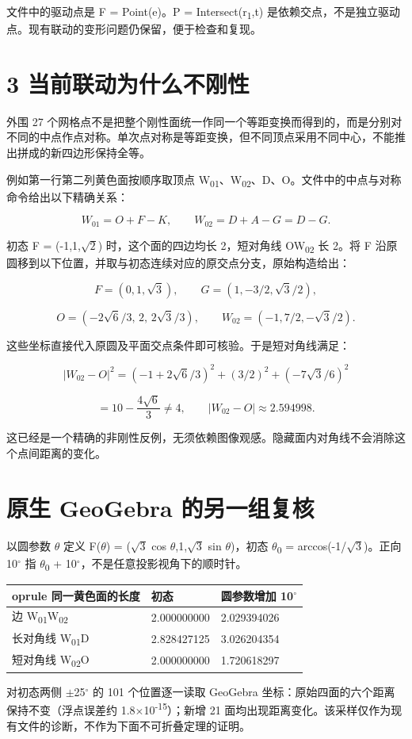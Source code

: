 \documentclass[UTF8,a4paper,11pt]{ctexart}
\begin{document}
文件中的驱动点是 F = Point(e)。P = Intersect(r\textsubscript{1},t) 是依赖交点，不是独立驱动点。现有联动的变形问题仍保留，便于检查和复现。

\newpage
\section*{3  当前联动为什么不刚性}
外围 27 个网格点不是把整个刚性面统一作同一个等距变换而得到的，而是分别对不同的中点作点对称。单次点对称是等距变换，但不同顶点采用不同中心，不能推出拼成的新四边形保持全等。

例如第一行第二列黄色面按顺序取顶点 W\textsubscript{01}、W\textsubscript{02}、D、O。文件中的中点与对称命令给出以下精确关系：


\[
W_{01}=O+F-K,\qquad W_{02}=D+A-G=D-G.
\]

初态 F = (-1,1,\(\sqrt{2}\)) 时，这个面的四边均长 2，短对角线 OW\textsubscript{02} 长 2。将 F 沿原圆移到以下位置，并取与初态连续对应的原交点分支，原始构造给出：


\[
F=(0,1,\sqrt{3}),\qquad G=(1,-3/2,\sqrt{3}/2),
\]


\[
O=(-2\sqrt{6}/3,\,2,\,2\sqrt{3}/3),\qquad W_{02}=(-1,7/2,-\sqrt{3}/2).
\]

这些坐标直接代入原圆及平面交点条件即可核验。于是短对角线满足：


\[
|W_{02}-O|^2=(-1+2\sqrt{6}/3)^2+(3/2)^2+(-7\sqrt{3}/6)^2
\]


\[
=10-\frac{4\sqrt{6}}{3}\ne 4,\qquad |W_{02}-O|\approx 2.594998.
\]

这已经是一个精确的非刚性反例，无须依赖图像观感。隐藏面内对角线不会消除这个点间距离的变化。

\section*{原生 GeoGebra 的另一组复核}
以圆参数 \(\theta\) 定义 F(\(\theta\)) = (\(\sqrt{3}\) cos \(\theta\),1,\(\sqrt{3}\) sin \(\theta\))，初态 \(\theta\)\textsubscript{0} = arccos(-1/\(\sqrt{3}\))。正向 10\({}^\circ\) 指 \(\theta\)\textsubscript{0} + 10\({}^\circ\)，不是任意投影视角下的顺时针。

\begin{longtable}{lll}	oprule
同一黄色面的长度 & 初态 & 圆参数增加 10\({}^\circ\) \\ \midrule
边 W\textsubscript{01}W\textsubscript{02} & 2.000000000 & 2.029394026 \\
长对角线 W\textsubscript{01}D & 2.828427125 & 3.026204354 \\
短对角线 W\textsubscript{02}O & 2.000000000 & 1.720618297 \\
\bottomrule\end{longtable}
对初态两侧 \(\pm\)25\({}^\circ\) 的 101 个位置逐一读取 GeoGebra 坐标：原始四面的六个距离保持不变（浮点误差约 1.8\(\times\)10\textsuperscript{-15}）；新增 21 面均出现距离变化。该采样仅作为现有文件的诊断，不作为下面不可折叠定理的证明。
\end{document}
